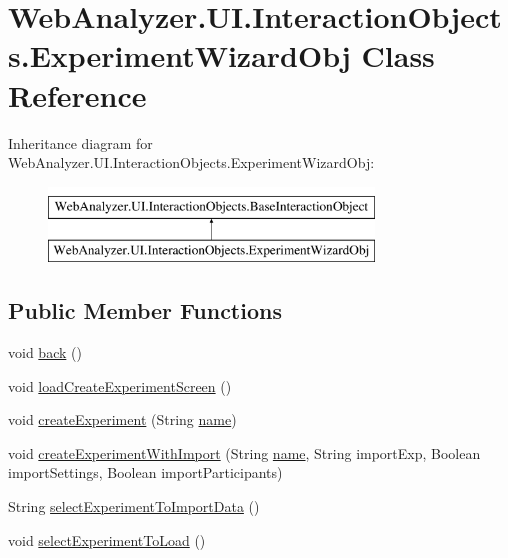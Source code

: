 \hypertarget{class_web_analyzer_1_1_u_i_1_1_interaction_objects_1_1_experiment_wizard_obj}{}\section{Web\+Analyzer.\+U\+I.\+Interaction\+Objects.\+Experiment\+Wizard\+Obj Class Reference}
\label{class_web_analyzer_1_1_u_i_1_1_interaction_objects_1_1_experiment_wizard_obj}
Inheritance diagram for Web\+Analyzer.\+U\+I.\+Interaction\+Objects.\+Experiment\+Wizard\+Obj\+:\begin{figure}[H]
\begin{center}
\leavevmode
\includegraphics[height=2.000000cm]{class_web_analyzer_1_1_u_i_1_1_interaction_objects_1_1_experiment_wizard_obj}
\end{center}
\end{figure}
\subsection*{Public Member Functions}
\begin{DoxyCompactItemize}
\item 
void \hyperlink{class_web_analyzer_1_1_u_i_1_1_interaction_objects_1_1_experiment_wizard_obj_a5df5c95c1b33e86c7b095a4af6861994}{back} ()
\item 
void \hyperlink{class_web_analyzer_1_1_u_i_1_1_interaction_objects_1_1_experiment_wizard_obj_ab31f1a51792e84018e1dcce87903551e}{load\+Create\+Experiment\+Screen} ()
\item 
void \hyperlink{class_web_analyzer_1_1_u_i_1_1_interaction_objects_1_1_experiment_wizard_obj_ade6772af7c7187e6296a727f11108581}{create\+Experiment} (String \hyperlink{_u_i_2_h_t_m_l_resources_2js_2src_2create__experiment_8js_adac2bcb4f01b574cbc63fe8ee2c56bf0}{name})
\item 
void \hyperlink{class_web_analyzer_1_1_u_i_1_1_interaction_objects_1_1_experiment_wizard_obj_a0144b3cb0dabf7c25d82fc81defbd877}{create\+Experiment\+With\+Import} (String \hyperlink{_u_i_2_h_t_m_l_resources_2js_2src_2create__experiment_8js_adac2bcb4f01b574cbc63fe8ee2c56bf0}{name}, String import\+Exp, Boolean import\+Settings, Boolean import\+Participants)
\item 
String \hyperlink{class_web_analyzer_1_1_u_i_1_1_interaction_objects_1_1_experiment_wizard_obj_aab651292223bcd2e294b85a3a2aed2c4}{select\+Experiment\+To\+Import\+Data} ()
\item 
void \hyperlink{class_web_analyzer_1_1_u_i_1_1_interaction_objects_1_1_experiment_wizard_obj_a187c4039f4ed7c0bdca88b2abbebc606}{select\+Experiment\+To\+Load} ()
\end{DoxyCompactItemize}
